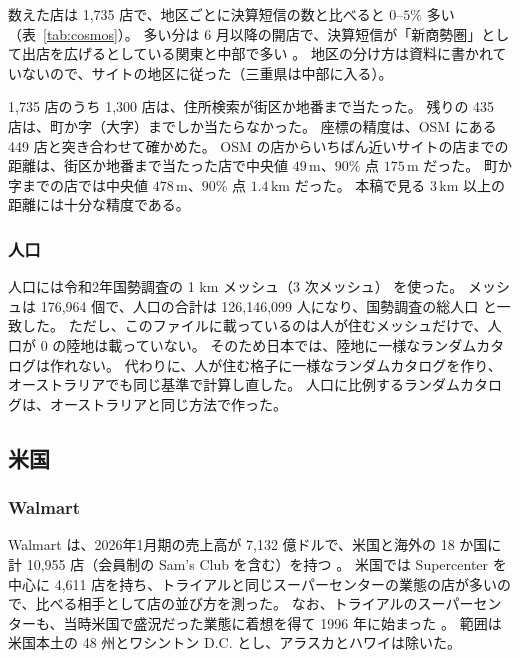 \documentclass[a4paper,11pt]{ltjsarticle}
\begin{document}
数えた店は 1,735 店で、地区ごとに決算短信の数と比べると $0$--$5\%$ 多い（表~\ref{tab:cosmos}）。
多い分は 6 月以降の開店で、決算短信が「新商勢圏」として出店を広げるとしている関東と中部で多い \cite{CosmosFY26}。
地区の分け方は資料に書かれていないので、サイトの地区に従った（三重県は中部に入る）。
\begin{table}[t]
  \centering
  \caption{コスモスの地区ごとの店舗数。サイトは 2026年11月12日、公式は 2026年5月末時点。
    東北はその後に初めて出店した福島県の 2 店。}
  \label{tab:cosmos}
  \small
  
\end{table}

1,735 店のうち 1,300 店は、住所検索が街区か地番まで当たった。
残りの 435 店は、町か字（大字）までしか当たらなかった。
座標の精度は、OSM にある 449 店と突き合わせて確かめた。
OSM の店からいちばん近いサイトの店までの距離は、街区か地番まで当たった店で中央値 $49\,\mathrm{m}$、$90\%$ 点 $175\,\mathrm{m}$ だった。
町か字までの店では中央値 $478\,\mathrm{m}$、$90\%$ 点 $1.4\,\mathrm{km}$ だった。
本稿で見る $3\,\mathrm{km}$ 以上の距離には十分な精度である。

\subsubsection{人口}

人口には令和2年国勢調査の 1 km メッシュ（3 次メッシュ）\cite{EStatMesh2020} を使った。
メッシュは 176,964 個で、人口の合計は 126,146,099 人になり、国勢調査の総人口 \cite{Census2020Summary} と一致した。
ただし、このファイルに載っているのは人が住むメッシュだけで、人口が $0$ の陸地は載っていない。
そのため日本では、陸地に一様なランダムカタログは作れない。
代わりに、人が住む格子に一様なランダムカタログを作り、オーストラリアでも同じ基準で計算し直した。
人口に比例するランダムカタログは、オーストラリアと同じ方法で作った。

\subsection{米国}
\label{sec:data-us}

\subsubsection{Walmart}

Walmart は、2026年1月期の売上高が 7,132 億ドルで、米国と海外の 18 か国に計 10,955 店（会員制の Sam's Club を含む）を持つ \cite{WalmartFY26}。
米国では Supercenter を中心に 4,611 店を持ち、トライアルと同じスーパーセンターの業態の店が多いので、比べる相手として店の並び方を測った。
なお、トライアルのスーパーセンターも、当時米国で盛況だった業態に着想を得て 1996 年に始まった \cite{TrialHistory}。
範囲は米国本土の 48 州とワシントン D.C. とし、アラスカとハワイは除いた。
\end{document}
